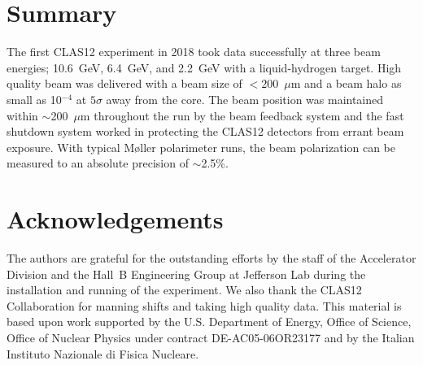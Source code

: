 \documentclass[final,3p,times,twocolumn]{elsarticle}
\begin{document}

\newpage

\linenumbers









\section{Summary}

The first CLAS12 experiment in 2018 took data successfully at three beam energies; 10.6~GeV, 6.4~GeV, and
2.2~GeV with a liquid-hydrogen target. High quality beam was delivered with a beam size of $< 200$~$\mu$m
and a beam halo as small as 10$^{-4}$ at $5\sigma$ away from the core. The beam position was maintained within
$\sim$200~$\mu$m throughout the run  by the beam feedback system and the fast shutdown system worked in
protecting the CLAS12 detectors from errant beam exposure. With typical M{\o}ller polarimeter runs, the beam
polarization can be measured to an absolute precision of $\sim$2.5\%. 

\section{Acknowledgements}

The authors are grateful for the outstanding efforts by the staff of the Accelerator Division and the Hall~B
Engineering Group at Jefferson Lab during the installation and running of the experiment. We also thank the
CLAS12 Collaboration for manning shifts and taking high quality data. This material is based upon work supported
by the U.S. Department of Energy, Office of Science, Office of Nuclear Physics under contract
DE-AC05-06OR23177 and by the Italian Instituto Nazionale di Fisica Nucleare.





%


%


\end{document}

